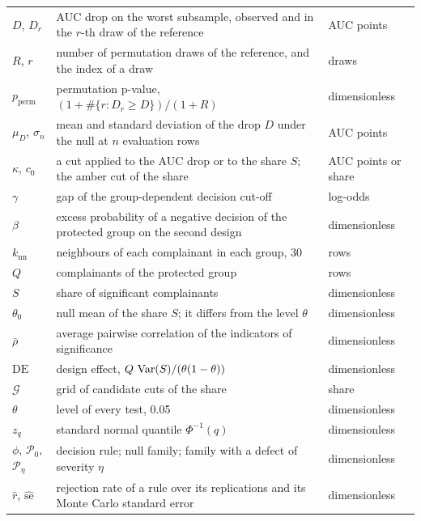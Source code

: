 \begin{table}[htbp]
{\begin{tabular}{lll}
$D$, $D_r$ & \relax AUC drop on the worst subsample, observed and in the $r$-th draw of the reference & AUC points \\
$R$, $r$ & number of permutation draws of the reference, and the index of a draw & draws \\
$p_{\mathrm{perm}}$ & \relax permutation p-value, $(1+\#\{r:D_r\ge D\})/(1+R)$ & dimensionless \\
$\mu_D$, $\sigma_n$ & \relax mean and standard deviation of the drop $D$ under the null at $n$ evaluation rows & AUC points \\
$\kappa$, $c_0$ & \relax a cut applied to the AUC drop or to the share $S$; the amber cut of the share & AUC points or share \\
$\gamma$ & gap of the group-dependent decision cut-off & log-odds \\
$\beta$ & excess probability of a negative decision of the protected group on the second design & dimensionless \\
$k_{\mathrm{nn}}$ & neighbours of each complainant in each group, 30 & rows \\
$Q$ & complainants of the protected group & rows \\
$S$ & share of significant complainants & dimensionless \\
$\theta_0$ & \relax null mean of the share $S$; it differs from the level $\theta$ & dimensionless \\
$\bar\rho$ & average pairwise correlation of the indicators of significance & dimensionless \\
$\mathrm{DE}$ & \relax design effect, $Q\,\operatorname{Var}(S)/(\theta(1-\theta))$ & dimensionless \\
$\mathcal{G}$ & grid of candidate cuts of the share & share \\
$\theta$ & level of every test, 0.05 & dimensionless \\
$z_{q}$ & \relax standard normal quantile $\Phi^{-1}(q)$ & dimensionless \\
$\phi$, $\mathcal{P}_0$, $\mathcal{P}_\eta$ & \relax decision rule; null family; family with a defect of severity $\eta$ & dimensionless \\
$\hat r$, $\widehat{\mathrm{se}}$ & rejection rate of a rule over its replications and its Monte Carlo standard error & dimensionless \\
\bottomrule
\end{tabular}}
\end{table}
